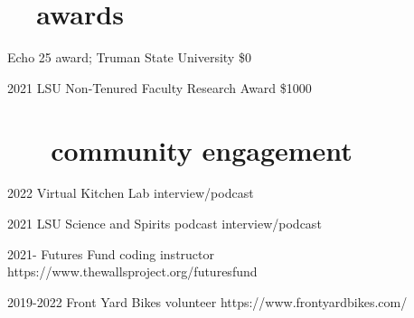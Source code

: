 \documentclass[]{CV}
\begin{document}
{%





\section{\faTrophy \ \ awards}
\begin{entrylist}

 {Echo 25 award; Truman State University}
 {\$0}
 
 \entry
 {2021}
 {LSU Non-Tenured Faculty Research Award}
 {\$1000}

\end{entrylist}











\section{ \faUserPlus \ \ \ community engagement}

\begin{entrylist}




 \entry
	 {2022}
	 {Virtual Kitchen Lab}
	 {interview/podcast}

 \entry
	 {2021}
	 {LSU Science and Spirits podcast}
	 {interview/podcast}
 
 \entry
	 {2021-}
	 {Futures Fund coding instructor}
	 {https://www.thewallsproject.org/futuresfund}

 \entry
	 {2019-2022}
	 {Front Yard Bikes volunteer}
	 {https://www.frontyardbikes.com/}


\end{entrylist}}
\end{document}
